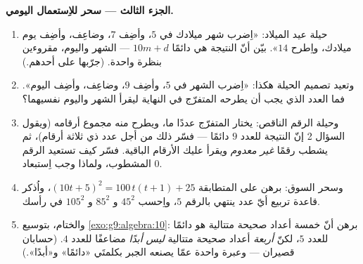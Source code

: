 \begin{problem}
\medskip
\noindent\textbf{الجزء الثالث --- سحر للاِستعمال اليومي.}
\begin{enumerate}[resume]
  \item حيلة عيد الميلاد: «اِضرب شهر ميلادك في $5$، وأضِف $7$،
        وضاعِف، وأضِف يوم ميلادك، واِطرح $14$». بيّن أنّ النتيجة
        هي دائمًا $10m + d$ --- الشهر واليوم، مقروءين بنظرة
        واحدة. (جرّبها على أحدهم.)
  \item وتعيد تصميم الحيلة هكذا: «اِضرب الشهر في $5$، وأضِف $9$،
        وضاعِف، وأضِف اليوم». فما العدد الذي يجب أن يطرحه
        المتفرّج في النهاية ليقرأ الشهر واليوم نفسيهما؟
  \item وحيلة الرقم الناقص: يختار المتفرّج عددًا ما، ويطرح منه
        مجموع أرقامه (ويقول السؤال 2 إنّ النتيجة 
        للعدد $9$ دائمًا --- فسّر ذلك من أجل عدد ذي ثلاثة
        أرقام)، ثم يشطب رقمًا \emph{غير معدوم} ويقرأ عليك
        الأرقام الباقية. فسّر كيف تستعيد الرقم المشطوب، ولماذا
        وجب اِستبعاد $0$.
  \item وسحر السوق: برهن على المتطابقة
        $(10t + 5)^2 = 100\,t(t+1) + 25$، واُذكر قاعدة تربيع أيّ
        عدد ينتهي بالرقم $5$، واِحسب $45^2$ و $85^2$ و $105^2$
        في رأسك.
  \item والختام، بتوسيع \cref{exo:g9:algebra:10}: برهن أنّ
         خمسة أعداد صحيحة متتالية هو دائمًا 
        للعدد $5$، لكنّ  \emph{أربعة} أعداد صحيحة
        متتالية \emph{ليس أبدًا} مضاعفًا للعدد $4$. (حسابان
        قصيران --- وعبرة واحدة عمّا يصنعه الجبر بكلمتَي «دائمًا»
        و«أبدًا».)
\end{enumerate}
\end{problem}
